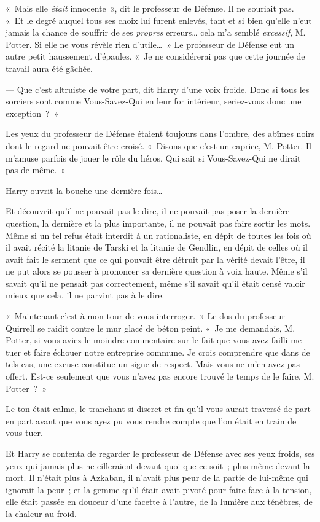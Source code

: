 «~Mais elle \emph{était} innocente~», dit le professeur de Défense.
Il ne souriait pas.
«~Et le degré auquel tous ses choix lui furent enlevés, tant et si bien qu'elle n'eut jamais la chance de souffrir de ses \emph{propres} erreurs… cela m'a semblé \emph{excessif}, M. Potter.
Si elle ne vous révèle rien d'utile…~»
Le professeur de Défense eut un autre petit haussement d'épaules.
«~Je ne considérerai pas que cette journée de travail aura été gâchée.

--- Que c'est altruiste de votre part, dit Harry d'une voix froide.
Donc si tous les sorciers sont comme Vous-Savez-Qui en leur for intérieur, seriez-vous donc une exception~?~»

Les yeux du professeur de Défense étaient toujours dans l'ombre, des abîmes noirs dont le regard ne pouvait être croisé.
«~Disons que c'est un caprice, M. Potter.
Il m'amuse parfois de jouer le rôle du héros.
Qui sait si Vous-Savez-Qui ne dirait pas de même.~»

Harry ouvrit la bouche une dernière fois…

Et découvrit qu'il ne pouvait pas le dire, il ne pouvait pas poser la dernière question, la dernière et la plus importante, il ne pouvait pas faire sortir les mots.
Même si un tel refus était interdit à un rationaliste, en dépit de toutes les fois où il avait récité la litanie de Tarski et la litanie de Gendlin, en dépit de celles où il avait fait le serment que ce qui pouvait être détruit par la vérité devait l'être, il ne put alors se pousser à prononcer sa dernière question à voix haute.
Même s'il savait qu'il ne pensait pas correctement, même s'il savait qu'il était censé valoir mieux que cela, il ne parvint pas à le dire.

«~Maintenant c'est à mon tour de vous interroger.~»
Le dos du professeur Quirrell se raidit contre le mur glacé de béton peint.
«~Je me demandais, M. Potter, si vous aviez le moindre commentaire sur le fait que vous avez failli me tuer et faire échouer notre entreprise commune.
Je crois comprendre que dans de tels cas, une excuse constitue un signe de respect.
Mais vous ne m'en avez pas offert.
Est-ce seulement que vous n'avez pas encore trouvé le temps de le faire, M. Potter~?~»

Le ton était calme, le tranchant si discret et fin qu'il vous aurait traversé de part en part avant que vous ayez pu vous rendre compte que l'on était en train de vous tuer.

Et Harry se contenta de regarder le professeur de Défense avec ses yeux froids, ses yeux qui jamais plus ne cilleraient devant quoi que ce soit~; plus même devant la mort.
Il n'était plus à Azkaban, il n'avait plus peur de la partie de lui-même qui ignorait la peur~; et la gemme qu'il était avait pivoté pour faire face à la tension, elle était passée en douceur d'une facette à l'autre, de la lumière aux ténèbres, de la chaleur au froid.

